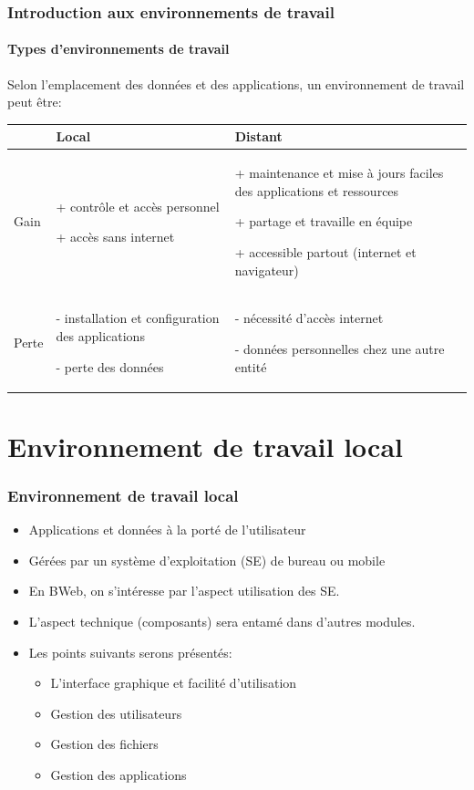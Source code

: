 \documentclass{beamer}
\begin{document}
\begin{frame}
\frametitle{Introduction aux environnements de travail}
\framesubtitle{Types d'environnements de travail}

Selon l'emplacement des données et des applications, un environnement de travail peut être: 

\begin{tabular}{p{}p{}p{}}
	\hline\hline
	& Local & Distant \\
	\hline\hline
	
	Gain &
	+ contrôle et accès personnel 
	
	+ accès sans internet

	 & 
	+ maintenance et mise à jours faciles des applications et ressources
	
	+ partage et travaille en équipe
	
	+ accessible partout (internet et navigateur)
	 \\
	
	\hline
	Perte &
	- installation et configuration des applications
	
	- perte des données
	&
	- nécessité d'accès internet
	
	- données personnelles chez une autre entité 
	\\
	\hline\hline
\end{tabular}

\end{frame}

\section{Environnement de travail local}

\begin{frame}
\frametitle{Environnement de travail local}

\begin{itemize}
	\item Applications et données à la porté de l'utilisateur 
	\item Gérées par un système d'exploitation (SE) de bureau ou mobile 
	\item En BWeb, on s'intéresse par l'aspect utilisation des SE. 
	\item L'aspect technique (composants) sera entamé dans d'autres modules. 
	\item Les points suivants serons présentés:
	\begin{itemize}
		\item L'interface graphique et facilité d'utilisation 
		\item Gestion des utilisateurs
		\item Gestion des fichiers
		\item Gestion des applications
	\end{itemize}
	
\end{itemize}

\end{frame}
\end{document}

